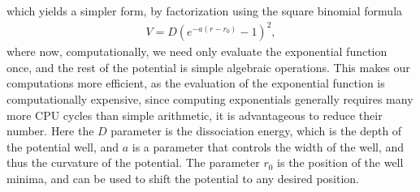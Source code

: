 \documentclass{subfiles}
\begin{document}
which yields a simpler form, by factorization using the square binomial formula
\begin{align}
    V = D(e^{-a(r-r_0)} - 1)^2\label{eq:morse_potential},
\end{align}
where now, computationally, we need only evaluate the exponential function once, and the rest of the potential is simple algebraic operations. This makes our computations more efficient, as the evaluation of the exponential function is computationally expensive, since computing exponentials generally requires many more CPU cycles than simple arithmetic, it is advantageous to reduce their number. Here the $D$ parameter is the dissociation energy, which is the depth of the potential well, and $a$ is a parameter that controls the width of the well, and thus the curvature of the potential. The parameter $r_0$ is the position of the well minima, and can be used to shift the potential to any desired position.\\
\end{document}
